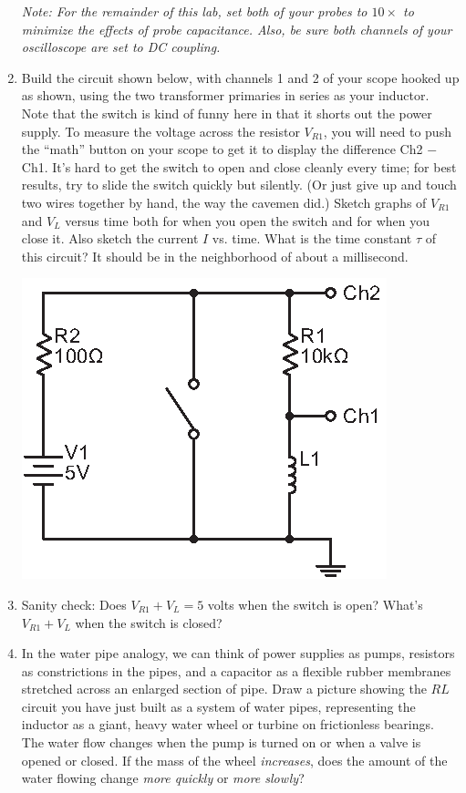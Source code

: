 \begin{enumerate}[wide]
\medskip 

\textit{Note: For the remainder of this lab, set both of your probes to $10\times$ to minimize the effects of probe capacitance. Also, be sure both channels of your oscilloscope are set to DC coupling.}

\item Build the circuit shown below, with channels 1 and 2 of your scope hooked up as shown, using the two transformer primaries in series as your inductor.  Note that the switch is kind of funny here in that it shorts out the power supply.  To measure the voltage across the resistor $V_{R1}$, you will need to push the ``math'' button on your scope to get it to display the difference Ch2 $-$ Ch1.  It's hard to get the switch to open and close cleanly every time; for best results, try to slide the switch quickly but silently.  (Or just give up and touch two wires together by hand, the way the cavemen did.)  Sketch graphs of $V_{R1}$ and $V_L$ versus time both for when you open the switch and for when you close it.   Also sketch the current $I$ vs. time.  What is the time constant $\tau$ of this circuit?  It should be in the neighborhood of about a millisecond.  \label{part_rl_constant}
\begin{center}
\includegraphics{inductors/single_dc_inductor.eps}
\end{center}

\item Sanity check: Does $V_{R1} +V_L = 5$ volts when the switch is open?  What's $V_{R1} +V_L$ when the switch is closed?

\item In the water pipe analogy, we can think of power supplies as pumps, resistors as constrictions in the pipes, and a capacitor as a flexible rubber membranes stretched across an enlarged section of pipe.  Draw a picture showing the $RL$ circuit you have just built as a system of water pipes, representing the inductor as a giant, heavy water wheel or turbine on frictionless bearings.  
The water flow changes when the pump is turned on or when a valve is opened or closed.
If the mass of the wheel \textit{increases}, does the amount of the water flowing change \textit{more quickly} or \textit{more slowly}?


\end{enumerate}
